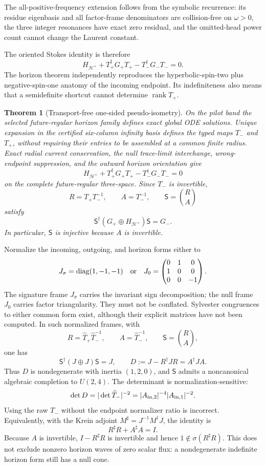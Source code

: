 \documentclass[11pt]{article}
\newtheorem{theorem}{Theorem}[section]
\theoremstyle{definition}
\theoremstyle{remark}
\begin{document}
The all-positive-frequency extension follows from the symbolic recurrence:
its residue eigenbasis and all factor-frame denominators are collision-free
on \(\omega>0\), the three integer resonances have exact zero residual, and
the omitted-head power count cannot change the Laurent constant.

The oriented Stokes identity is therefore
\[
 H_{\mathcal H^+}
 +T_+^\dagger G_+T_+
 -T_-^\dagger G_-T_-=0.
\]
The horizon theorem independently reproduces the hyperbolic-spin-two plus
negative-spin-one anatomy of the incoming endpoint.  Its indefiniteness
also means that a semidefinite shortcut cannot determine
\(\operatorname{rank}T_+\).

\begin{theorem}[Transport-free one-sided pseudo-isometry]
\label{thm:axial-transport-free-pseudo-isometry}
On the pilot band the selected future-regular horizon family defines exact
global ODE solutions.  Unique expansion in the certified six-column
infinity basis defines the typed maps \(T_-\) and \(T_+\), without requiring
their entries to be assembled at a common finite radius.  Exact radial
current conservation, the null trace-limit interchange, wrong-endpoint
suppression, and the outward horizon orientation give
\[
 H_{\mathcal H^+}
 +T_+^\dagger G_+T_+
 -T_-^\dagger G_-T_-=0
\]
on the complete future-regular three-space.  Since \(T_-\) is invertible,
\[
 R=T_+T_-^{-1},\qquad A=T_-^{-1},\qquad
 \mathsf S=\binom RA
\]
satisfy
\[
 \mathsf S^\dagger
 (G_+\oplus H_{\mathcal H^+})\mathsf S=G_-.
\]
In particular, \(\mathsf S\) is injective because \(A\) is invertible.
\end{theorem}

Normalize the
incoming, outgoing, and horizon forms either to
\[
 J_\sigma=\operatorname{diag}(1,-1,-1)
 \quad\hbox{or}\quad
 J_0=\begin{pmatrix}0&1&0\\1&0&0\\0&0&-1\end{pmatrix}.
\]
The signature frame \(J_\sigma\) carries the invariant sign
decomposition; the null frame \(J_0\) carries factor triangularity.  They
must not be conflated.  Sylvester congruences to either common form exist,
although their explicit matrices have not been computed.  In such
normalized frames, with
\[
 R=\widehat T_+\widehat T_-^{-1},\qquad
 A=\widehat T_-^{-1},\qquad
 \mathsf S=\binom RA,
\]
one has
\[
 \mathsf S^\dagger(J\oplus J)\mathsf S=J,\qquad
 D:=J-R^\dagger JR=A^\dagger JA.
\]
Thus \(D\) is nondegenerate with inertia \((1,2,0)\), and
\(\mathsf S\) admits a noncanonical algebraic completion to \(U(2,4)\).
The determinant is normalization-sensitive:
\[
 \det D=|\det\widehat T_-|^{-2}
 =|A_{{\rm in},2}|^{-4}|A_{{\rm in},1}|^{-2}.
\]
Using the raw \(T_-\) without the endpoint normalizer ratio is incorrect.
Equivalently, with the Krein adjoint \(M^\sharp=J^{-1}M^\dagger J\),
the identity is
\[
 R^\sharp R+A^\sharp A=I.
\]
Because \(A\) is invertible, \(I-R^\sharp R\) is invertible and hence
\(1\notin\sigma(R^\sharp R)\).  This does not exclude nonzero horizon
waves of zero scalar flux: a nondegenerate indefinite horizon form still
has a null cone.
\end{document}
